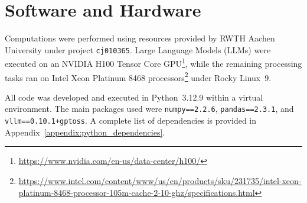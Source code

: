 \section{Software and Hardware}
Computations were performed using resources provided by RWTH Aachen University under project \texttt{cj010365}. 
Large Language Models (LLMs) were executed on an NVIDIA H100 Tensor Core GPU\footnote{\url{https://www.nvidia.com/en-us/data-center/h100/}}, 
while the remaining processing tasks ran on Intel\textsuperscript{\textregistered} Xeon\textsuperscript{\textregistered} Platinum 8468 processors\footnote{\url{https://www.intel.com/content/www/us/en/products/sku/231735/intel-xeon-platinum-8468-processor-105m-cache-2-10-ghz/specifications.html}} 
under Rocky Linux~9. 

All code was developed and executed in Python~3.12.9 within a virtual environment. The main packages used were 
\texttt{numpy==2.2.6}, \texttt{pandas==2.3.1}, and \texttt{vllm==0.10.1+gptoss}. 
A complete list of dependencies is provided in Appendix~\ref{appendix:python_dependencies}.

